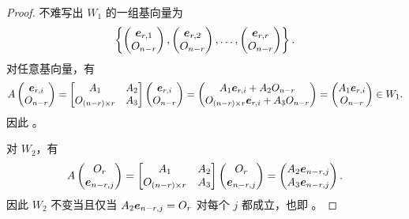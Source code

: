 \begin{proof}
不难写出 $W_1$ 的一组基向量为
\[
\left\{
\begin{pmatrix}\boldsymbol{e}_{r,1}\\ O_{n-r}\end{pmatrix},
\begin{pmatrix}\boldsymbol{e}_{r,2}\\ O_{n-r}\end{pmatrix},
\ldots,
\begin{pmatrix}\boldsymbol{e}_{r,r}\\ O_{n-r}\end{pmatrix}
\right\}.
\]
对任意基向量，有
\[
A \begin{pmatrix}\boldsymbol{e}_{r, i}\\ O_{n - r}\end{pmatrix} = \begin{bmatrix}
A_1 & A_2 \\
O_{\left(n - r\right) \times r} & A_3
\end{bmatrix}
\begin{pmatrix}
\boldsymbol{e}_{r, i} \\
O_{n - r}
\end{pmatrix} = \begin{pmatrix}
A_1 \boldsymbol{e}_{r, i} + A_2 O_{n - r} \\
O_{\left(n - r\right) \times r}\boldsymbol{e}_{r,i} + A_3 O_{n - r}
\end{pmatrix} = \begin{pmatrix}
A_1 \boldsymbol{e}_{r, i} \\
O_{n - r}
\end{pmatrix} \in W_1.
\]
因此 。

对 $W_2$，有
\[A \begin{pmatrix}O_r\\ \boldsymbol{e}_{n-r,j}\end{pmatrix} = \begin{bmatrix}
A_1 & A_2 \\
O_{\left(n - r\right) \times r} & A_3
\end{bmatrix}
\begin{pmatrix}O_r \\
\boldsymbol{e}_{n - r, j}
\end{pmatrix} = \begin{pmatrix}A_2 \boldsymbol{e}_{n - r, j} \\
A_3 \boldsymbol{e}_{n - r, j}
\end{pmatrix}.
\]
因此 $W_2$ 不变当且仅当 $A_2\boldsymbol{e}_{n-r,j}=O_r$ 对每个 $j$ 都成立，也即 。

\end{proof}
